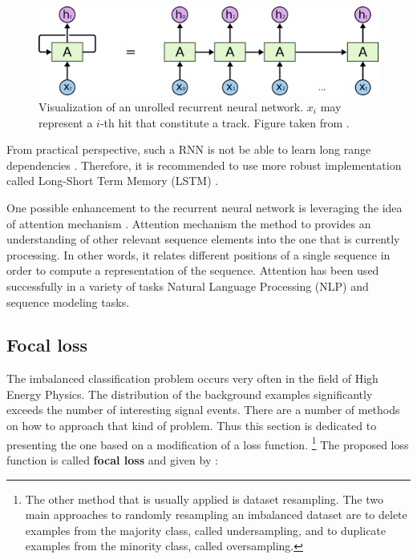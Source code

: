  \begin{figure}[!h]
\centering
\includegraphics{figures/RNN-unrolled.png}
\caption{Visualization of an unrolled recurrent neural network. $x_i$ may represent a $i$-th hit that constitute a track. Figure taken from \cite{rnn}. 
\label{fig:Focal loss}}
\end{figure}

From practical perspective, such a RNN is not be able to learn long range dependencies \cite{bengio_rnn}. Therefore, it is recommended to use more robust implementation called Long-Short Term Memory (LSTM) \cite{lstm}. 


One possible enhancement to the recurrent neural network is leveraging the idea of attention mechanism \cite{attention}. Attention mechanism the method to provides an understanding of other relevant sequence elements into the one that is currently processing. In other words, it relates different positions of a single sequence in order to compute a representation of the sequence. Attention has been used successfully in a variety of tasks Natural Language Processing (NLP) and sequence modeling tasks. 

\subsection{Focal loss}
\label{sec:focal_loss}

The imbalanced classification problem occurs very often in the field of High Energy Physics. The distribution of the background examples significantly exceeds the number of interesting signal events. There are a number of methods on how to approach that kind of problem. Thus this section is dedicated to presenting the one based on a modification of a loss function. \footnote{The other method that is usually applied is dataset resampling.  The two main approaches to randomly resampling an imbalanced dataset are to delete examples from the majority class, called undersampling, and to duplicate examples from the minority class, called oversampling.}  The proposed loss function is called \textbf{focal loss} and given by \cite{focal_loss}: 

